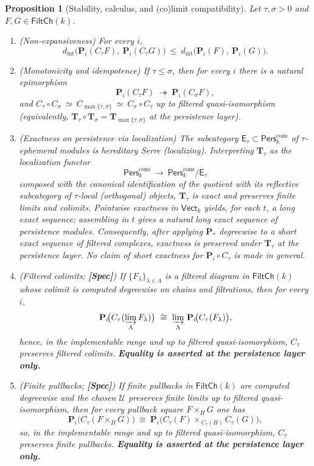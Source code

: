 \documentclass[11pt]{article}
\newcommand{\Pers}{\mathsf{Pers}}
\numberwithin{equation}{section}
\newtheorem{proposition}[theorem]{Proposition}
\theoremstyle{definition}
\begin{document}
\begin{proposition}[Stability, calculus, and (co)limit compatibility]\label{prop:stability}
Let \(\tau,\sigma>0\) and \(F,G\in\mathsf{FiltCh}(k)\).
\begin{enumerate}
  \item \textup{(Non-expansiveness)} For every \(i\),
  \[
  d_{\mathrm{int}}\!\big(\mathbf{P}_i(C_\tau F),\ \mathbf{P}_i(C_\tau G)\big)\ \le\ d_{\mathrm{int}}\!\big(\mathbf{P}_i(F),\ \mathbf{P}_i(G)\big).
  \]
  \item \textup{(Monotonicity and idempotence)} If \(\tau\le\sigma\), then for every \(i\) there is a natural epimorphism
  \[
  \mathbf{P}_i(C_\tau F)\ \twoheadrightarrow\ \mathbf{P}_i(C_\sigma F),
  \]
  and \(C_\tau\circ C_\sigma\ \simeq\ C_{\max\{\tau,\sigma\}}\ \simeq\ C_\sigma\circ C_\tau\) up to filtered quasi-isomorphism \emph{(equivalently, \(\mathbf{T}_\tau\circ \mathbf{T}_\sigma=\mathbf{T}_{\max\{\tau,\sigma\}}\) at the persistence layer)}.
  \item \textup{(Exactness on persistence via localization)} The subcategory \(\mathsf{E}_\tau\subset \Pers^{\mathrm{cons}}_k\) of \(\tau\)-ephemeral modules is hereditary Serre (localizing). Interpreting \(\mathbf{T}_\tau\) as the localization functor
  \[
  \Pers^{\mathrm{cons}}_k\ \longrightarrow\ \Pers^{\mathrm{cons}}_k/\mathsf{E}_\tau
  \]
  composed with the canonical identification of the quotient with its reflective subcategory of \(\tau\)-local (orthogonal) objects, \(\mathbf{T}_\tau\) is exact and preserves finite limits and colimits. \emph{Pointwise exactness in \(\mathsf{Vect}_k\) yields, for each \(t\), a long exact sequence; assembling in \(t\) gives a natural long exact sequence of persistence modules.} Consequently, after applying \(\mathbf{P}_\ast\) \emph{degreewise} to a short exact sequence of filtered complexes, exactness is preserved under \(\mathbf{T}_\tau\) \emph{at the persistence layer}. No claim of short exactness for \(\mathbf{P}_i\circ C_\tau\) is made in general.
  \item \textup{(Filtered colimits; \textbf{[Spec]})} If \(\{F_\lambda\}_{\lambda\in\Lambda}\) is a filtered diagram in \(\mathsf{FiltCh}(k)\) whose colimit is computed degreewise on chains and filtrations, then for every \(i\),
  \[
  \mathbf{P}_i\!\big(C_\tau(\varinjlim_\Lambda F_\lambda)\big)\ \cong\ \varinjlim_\Lambda\, \mathbf{P}_i\!\big(C_\tau(F_\lambda)\big),
  \]
  hence, in the implementable range and up to filtered quasi-isomorphism, \(C_\tau\) preserves filtered colimits. \textbf{Equality is asserted at the persistence layer only.}
  \item \textup{(Finite pullbacks; \textbf{[Spec]})} If finite pullbacks in \(\mathsf{FiltCh}(k)\) are computed degreewise and the chosen \(\mathcal{U}\) preserves finite limits up to filtered quasi-isomorphism, then for every pullback square \(F\times_H G\) one has
  \[
  \mathbf{P}_i\!\big(C_\tau(F\times_H G)\big)\ \cong\ \mathbf{P}_i\!\big(C_\tau(F)\times_{\,C_\tau(H)} C_\tau(G)\big),
  \]
  so, in the implementable range and up to filtered quasi-isomorphism, \(C_\tau\) preserves finite pullbacks. \textbf{Equality is asserted at the persistence layer only.}
\end{enumerate}
\end{proposition}
\end{document}
